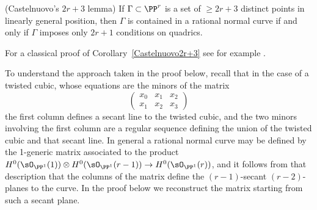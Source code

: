 \begin{corollary}(Castelnuovo's $2r+3$ lemma)\label{Castelnuovo2r+3}
If $\Gamma\subset \PP^r$ is a set of $\geq 2r+3$ distinct points in linearly general position, then
$\Gamma$ is contained in a rational normal curve if and only if $\Gamma$ imposes only $2r+1$
conditions on quadrics. 
\end{corollary}
 For a classical proof of Corollary~\ref{Castelnuovo2r+3} see for example \cite[p. 531]{Griffiths-Harris1978}.

 To understand the approach taken in the proof below, recall that in the case of a twisted
 cubic, whose equations are the minors of the matrix
 $$
\begin{pmatrix}
 x_0&x_1&x_2\\
 x_1&x_2&x_3
\end{pmatrix}
 $$
the first column defines a secant line to the twisted cubic, and the two minors involving the first column are a regular sequence defining the union of the twisted cubic and that secant line.
In general a rational normal curve may be defined by the 1-generic matrix  associated to the product $H^0(\sO_{\PP^1}(1)) \otimes H^0(\sO_{\PP^1}(r-1)) \to H^0(\sO_{\PP^1}(r))$,
and it follows from that description that the columns of the matrix define the $(r-1)$-secant $(r-2)$-planes to the curve. In the proof below we reconstruct the matrix starting from such a secant plane.


